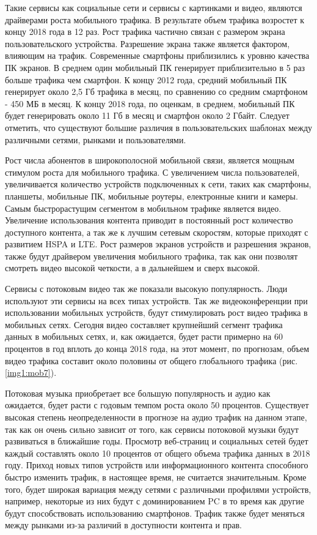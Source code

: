 Такие сервисы как социальные сети и сервисы с картинками и видео, являются драйверами роста мобильного трафика. В результате объем трафика возростет к концу 2018 года в 12 раз. Рост трафика частично связан с размером экрана пользовательского устройства. Разрешение экрана также является фактором, влияющим на трафик. Современные смартфоны приблизились к уровню качества ПК экранов. В среднем один мобильный ПК генерирует приблизительно в 5 раз больше трафика чем смартфон. К концу 2012 года, средний мобильный ПК генерирует около 2,5 Гб трафика в месяц, по сравнению со средним смартфоном - 450 МБ в месяц. К концу 2018 года, по оценкам, в среднем, мобильный ПК будет генерировать около 11 Гб в месяц и смартфон около 2 Гбайт. Следует отметить, что существуют большие различия в пользовательских шаблонах между различными сетями, рынками и пользователями.

Рост числа абонентов в широкополосной мобильной связи, является мощным стимулом роста для мобильного трафика. С увеличением числа пользователей, увеличивается количество устройств подключенных к сети, таких как смартфоны, планшеты, мобильные ПК, мобильные роутеры, електронные книги и камеры.  Самым быстрорастущим сегментом в мобильном трафике является видео. Увеличение использования контента приводит в постоянный рост количество доступного контента, а так же к лучшим сетевым скоростям, которые приходят с развитием HSPA и LTE. Рост размеров экранов устройств и разрешения экранов, также будут драйвером увеличения мобильного трафика, так как они позволят смотреть видео высокой четкости, а в дальнейшем и сверх высокой. 

Сервисы с потоковым видео так же показали высокую популярность. Люди используют эти сервисы на всех типах устройств. Так же видеоконференции при использовании мобильных устройств, будут стимулировать рост видео трафика в мобильных сетях. Сегодня видео составляет крупнейший сегмент трафика данных в мобильных сетях, и, как ожидается, будет расти примерно на 60 процентов в год вплоть до конца 2018 года, на этот момент, по прогнозам, объем видео трафика составит около половины от общего глобального трафика (рис. \ref{img1:mob7}).

Потоковая музыка приобретает все большую популярность и аудио как ожидается, будет расти с годовым темпом роста около 50 процентов. Существует высокая степень неопределенности в прогнозе на аудио трафик на данном этапе, так как он очень сильно зависит от того, как сервисы потоковой музыки будут развиваться в ближайшие годы.
Просмотр веб-страниц и социальных сетей будет каждый составлять около 10 процентов от общего объема трафика данных в 2018 году.
Приход новых типов устройств или информационного контента способного быстро изменить трафик, в настоящее время, не считается значительным. Кроме того, будет широкая вариация между сетями с различными профилями устройств, например, некоторые из них будут с доминированием PC в то время как другие будут способствовать использованию смартфонов. Трафик также будет меняться между рынками из-за различий в доступности контента и прав. 


